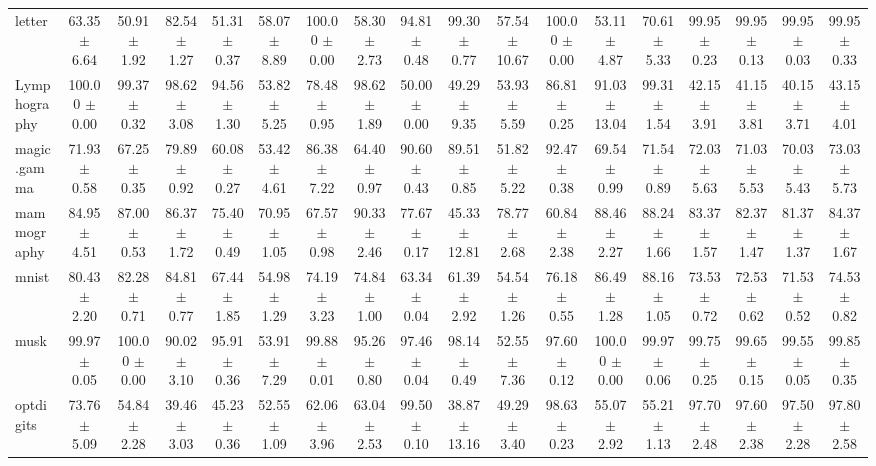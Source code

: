\begin{table}[ht]
\begin{adjustbox}{max width=\textwidth}
\begin{tabular}{lccccccccccccccccc}
          letter &  63.35 $\pm$ 6.64 &  50.91 $\pm$ 1.92 &  82.54 $\pm$ 1.27 &  51.31 $\pm$ 0.37 &  58.07 $\pm$ 8.89 & 100.00 $\pm$ 0.00 &  58.30 $\pm$ 2.73 & 94.81 $\pm$ 0.48 &  99.30 $\pm$ 0.77 & 57.54 $\pm$ 10.67 & 100.00 $\pm$ 0.00 &  53.11 $\pm$ 4.87 &  70.61 $\pm$ 5.33 &  99.95 $\pm$ 0.23 &  99.95 $\pm$ 0.13 &  99.95 $\pm$ 0.03 &  99.95 $\pm$ 0.33 \\
    Lymphography & 100.00 $\pm$ 0.00 &  99.37 $\pm$ 0.32 &  98.62 $\pm$ 3.08 &  94.56 $\pm$ 1.30 &  53.82 $\pm$ 5.25 &  78.48 $\pm$ 0.95 &  98.62 $\pm$ 1.89 & 50.00 $\pm$ 0.00 &  49.29 $\pm$ 9.35 &  53.93 $\pm$ 5.59 &  86.81 $\pm$ 0.25 & 91.03 $\pm$ 13.04 &  99.31 $\pm$ 1.54 &  42.15 $\pm$ 3.91 &  41.15 $\pm$ 3.81 &  40.15 $\pm$ 3.71 &  43.15 $\pm$ 4.01 \\
     magic.gamma &  71.93 $\pm$ 0.58 &  67.25 $\pm$ 0.35 &  79.89 $\pm$ 0.92 &  60.08 $\pm$ 0.27 &  53.42 $\pm$ 4.61 &  86.38 $\pm$ 7.22 &  64.40 $\pm$ 0.97 & 90.60 $\pm$ 0.43 &  89.51 $\pm$ 0.85 &  51.82 $\pm$ 5.22 &  92.47 $\pm$ 0.38 &  69.54 $\pm$ 0.99 &  71.54 $\pm$ 0.89 &  72.03 $\pm$ 5.63 &  71.03 $\pm$ 5.53 &  70.03 $\pm$ 5.43 &  73.03 $\pm$ 5.73 \\
     mammography &  84.95 $\pm$ 4.51 &  87.00 $\pm$ 0.53 &  86.37 $\pm$ 1.72 &  75.40 $\pm$ 0.49 &  70.95 $\pm$ 1.05 &  67.57 $\pm$ 0.98 &  90.33 $\pm$ 2.46 & 77.67 $\pm$ 0.17 & 45.33 $\pm$ 12.81 &  78.77 $\pm$ 2.68 &  60.84 $\pm$ 2.38 &  88.46 $\pm$ 2.27 &  88.24 $\pm$ 1.66 &  83.37 $\pm$ 1.57 &  82.37 $\pm$ 1.47 &  81.37 $\pm$ 1.37 &  84.37 $\pm$ 1.67 \\
           mnist &  80.43 $\pm$ 2.20 &  82.28 $\pm$ 0.71 &  84.81 $\pm$ 0.77 &  67.44 $\pm$ 1.85 &  54.98 $\pm$ 1.29 &  74.19 $\pm$ 3.23 &  74.84 $\pm$ 1.00 & 63.34 $\pm$ 0.04 &  61.39 $\pm$ 2.92 &  54.54 $\pm$ 1.26 &  76.18 $\pm$ 0.55 &  86.49 $\pm$ 1.28 &  88.16 $\pm$ 1.05 &  73.53 $\pm$ 0.72 &  72.53 $\pm$ 0.62 &  71.53 $\pm$ 0.52 &  74.53 $\pm$ 0.82 \\
            musk &  99.97 $\pm$ 0.05 & 100.00 $\pm$ 0.00 &  90.02 $\pm$ 3.10 &  95.91 $\pm$ 0.36 &  53.91 $\pm$ 7.29 &  99.88 $\pm$ 0.01 &  95.26 $\pm$ 0.80 & 97.46 $\pm$ 0.04 &  98.14 $\pm$ 0.49 &  52.55 $\pm$ 7.36 &  97.60 $\pm$ 0.12 & 100.00 $\pm$ 0.00 &  99.97 $\pm$ 0.06 &  99.75 $\pm$ 0.25 &  99.65 $\pm$ 0.15 &  99.55 $\pm$ 0.05 &  99.85 $\pm$ 0.35 \\
       optdigits &  73.76 $\pm$ 5.09 &  54.84 $\pm$ 2.28 &  39.46 $\pm$ 3.03 &  45.23 $\pm$ 0.36 &  52.55 $\pm$ 1.09 &  62.06 $\pm$ 3.96 &  63.04 $\pm$ 2.53 & 99.50 $\pm$ 0.10 & 38.87 $\pm$ 13.16 &  49.29 $\pm$ 3.40 &  98.63 $\pm$ 0.23 &  55.07 $\pm$ 2.92 &  55.21 $\pm$ 1.13 &  97.70 $\pm$ 2.48 &  97.60 $\pm$ 2.38 &  97.50 $\pm$ 2.28 &  97.80 $\pm$ 2.58 \\

\end{tabular}
\end{adjustbox}
\end{table}
